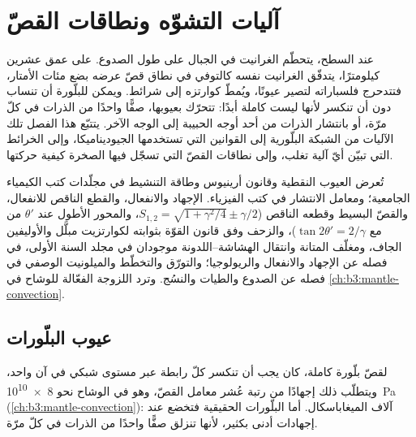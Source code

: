 \chapter{آليات التشوّه ونطاقات القصّ}\label{ch:b3:deformation-mechanisms}

عند السطح، يتحطّم الغرانيت في الجبال على طول الصدوع. على عمق عشرين
كيلومترًا، يتدفّق الغرانيت نفسه كالتوفي في نطاق قصّ عرضه بضع
مئات الأمتار، فتتدحرج فلسباراته لتصير عيونًا، ويُمطّ كوارتزه
إلى شرائط. ويمكن للبلّورة أن تنساب دون أن تنكسر لأنها ليست كاملة أبدًا:
تتحرّك بعيوبها، صفًّا واحدًا من الذرات في كلّ مرّة، أو بانتشار الذرات من
أحد أوجه الحبيبة إلى الوجه الآخر. يتتبّع هذا الفصل تلك الآليات من
الشبكة البلّورية إلى القوانين التي تستخدمها الجيوديناميكا، وإلى الخرائط التي تبيّن أيّ
آلية تغلب، وإلى نطاقات القصّ التي تسجّل فيها الصخرة كيفية حركتها.

\begin{recall}
تُعرض العيوب النقطية وقانون أرينيوس وطاقة التنشيط في مجلّدات
كتب الكيمياء الجامعية؛ ومعامل الانتشار في كتب الفيزياء.
الإجهاد والانفعال، والقطع الناقص للانفعال، والقصّ البسيط وقطعه الناقص
($S_{1,2} = \sqrt{1 + \gamma^2/4} \pm \gamma/2$، والمحور الأطول عند $\theta'$ من
 مع $\tan2\theta' = 2/\gamma$)، والزحف وفق قانون القوّة بثوابته
لكوارتزيت مبلَّل والأوليفين الجاف، ومغلّف المتانة
وانتقال الهشاشة--اللدونة موجودان في مجلد السنة الأولى، في فصله عن
الإجهاد والانفعال والريولوجيا؛ والتورّق والتخطّط والميلونيت الوصفي
في فصله عن الصدوع والطيات والنسُج. وترد اللزوجة الفعّالة
للوشاح في \cref{ch:b3:mantle-convection}.
\end{recall}

\section{عيوب البلّورات}

لقصّ بلّورة كاملة، كان يجب أن تنكسر كلّ رابطة عبر مستوى شبكي
في آن واحد، ويتطلّب ذلك إجهادًا من رتبة عُشر
معامل القصّ، وهو في الوشاح نحو \qty{8e10}{Pa}
(\cref{ch:b3:mantle-convection}): آلاف الميغاباسكال. أما البلّورات الحقيقية
فتخضع عند إجهادات أدنى بكثير، لأنها تنزلق صفًّا واحدًا من الذرات في كلّ مرّة.

